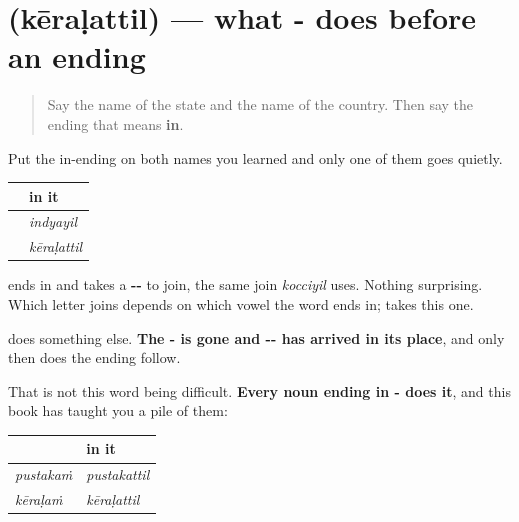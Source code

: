 \section[\texorpdfstring{\ml{കേരളത്തിൽ} (kēraḷattil)}{കേരളത്തിൽ (kēraḷattil)}]{ (kēraḷattil) — what - does before an ending}

\label{lesson:ML-C83-keralathil}



\begin{quote}
Say the name of the state and the name of the country. Then say the ending that means \textbf{in}.
\end{quote}

\begin{grammarlens}[title={Grammar Lens: two of your place names behave differently}]
Put the in-ending on both names you learned and only one of them goes quietly.

\noindent
\begin{tabularx}{\linewidth}{@{}>{\raggedright\arraybackslash}X>{\raggedright\arraybackslash}X@{}}
\toprule
\textbf{} & \textbf{in it} \\
\midrule
\textbf{\ml{ഇന്ത്യ}} & \textbf{\ml{ഇന്ത്യയിൽ}} \emph{indyayil} \\
\textbf{\ml{കേരളം}} & \textbf{\ml{കേരളത്തിൽ}} \emph{kēraḷattil} \\
\bottomrule
\end{tabularx}

\textbf{} ends in \textbf{} and takes a \textbf{--} to join, the same join \emph{kocciyil} uses. Nothing surprising. Which letter joins depends on which vowel the word ends in; \textbf{} takes this one.

\textbf{} does something else. \textbf{The - is gone and -- has arrived in its place}, and only then does the ending follow.

That is not this word being difficult. \textbf{Every noun ending in - does it}, and this book has taught you a pile of them:

\noindent
\begin{tabularx}{\linewidth}{@{}>{\raggedright\arraybackslash}X>{\raggedright\arraybackslash}X@{}}
\toprule
\textbf{} & \textbf{in it} \\
\midrule
\textbf{\ml{പുസ്തകം}} \emph{pustakaṁ} & \textbf{\ml{പുസ്തകത്തിൽ}} \emph{pustakattil} \\
\textbf{\ml{കേരളം}} \emph{kēraḷaṁ} & \textbf{\ml{കേരളത്തിൽ}} \emph{kēraḷattil} \\
\bottomrule
\end{tabularx}


\end{grammarlens}
